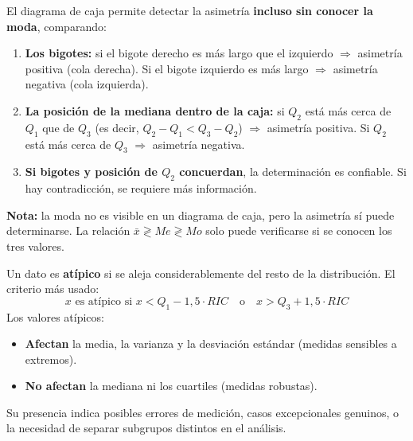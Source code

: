 \documentclass[11pt, letterpaper]{article}
\begin{document}
\begin{tcolorbox}[importantbox, title={¿Cómo detectar la asimetría desde un diagrama de caja?}]
El diagrama de caja permite detectar la asimetría \textbf{incluso sin conocer la moda}, comparando:
\begin{enumerate}[label=\arabic*.]
  \item \textbf{Los bigotes:} si el bigote derecho es más largo que el izquierdo $\Rightarrow$ asimetría positiva (cola derecha). Si el bigote izquierdo es más largo $\Rightarrow$ asimetría negativa (cola izquierda).
  \item \textbf{La posición de la mediana dentro de la caja:} si $Q_2$ está más cerca de $Q_1$ que de $Q_3$ (es decir, $Q_2 - Q_1 < Q_3 - Q_2$) $\Rightarrow$ asimetría positiva. Si $Q_2$ está más cerca de $Q_3$ $\Rightarrow$ asimetría negativa.
  \item \textbf{Si bigotes y posición de $Q_2$ concuerdan}, la determinación es confiable. Si hay contradicción, se requiere más información.
\end{enumerate}

\medskip
\textbf{Nota:} la moda no es visible en un diagrama de caja, pero la asimetría sí puede determinarse. La relación $\bar{x} \gtrless Me \gtrless Mo$ solo puede verificarse si se conocen los tres valores.
\end{tcolorbox}

\begin{tcolorbox}[importantbox, title={Valores atípicos (outliers)}]
Un dato es \textbf{atípico} si se aleja considerablemente del resto de la distribución. El criterio más usado:
\[
x \text{ es atípico si } x < Q_1 - 1{,}5 \cdot RIC \quad \text{o} \quad x > Q_3 + 1{,}5 \cdot RIC
\]
Los valores atípicos:
\begin{itemize}
  \item \textbf{Afectan} la media, la varianza y la desviación estándar (medidas sensibles a extremos).
  \item \textbf{No afectan} la mediana ni los cuartiles (medidas robustas).
\end{itemize}
Su presencia indica posibles errores de medición, casos excepcionales genuinos, o la necesidad de separar subgrupos distintos en el análisis.
\end{tcolorbox}
\end{document}

